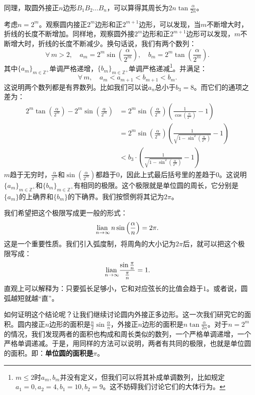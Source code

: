 \documentclass[12pt,UTF8]{ctexbook}
\begin{document}
同理，取圆外接正$n$边形$B_1B_2\ldots B_n$，可以算得其周长为$2n\tan{\frac{\alpha}{2n}}$。

考虑$n=2^m$。观察圆内接正$2^m$边形和正$2^{m+1}$边形，可以发现，当$m$不断增大时，折线的长度不断增加。同样地，观察圆外接$2^m$边形和正$2^{m+1}$边形可以发现，$m$不断增大时，折线的长度不断减少。换句话说，我们有两个数列：
$$ \forall \, m > 2, \quad a_m = 2^m\sin{\left(\frac{\alpha}{2^m}\right)}, \quad b_m = 2^{m}\tan{\left(\frac{\alpha}{2^m}\right)}. $$
其中$\{a_m\}_{m\in\mathbb{Z}^+}$单调严格递增，$\{b_m\}_{m\in\mathbb{Z}^+}$单调严格递减\footnote{$m\leqslant 2$时$a_m,b_m$并没有定义，但我们可以将其补成单调数列，比如规定$a_1=0,a_2=4,b_1=10,b_2=9$。这不妨碍我们讨论它们的大体行为。}。并满足：
$$ \forall \, m, \quad a_m < a_{m+1} < b_{m+1} < b_m.$$
这说明两个数列都是有界数列。比如我们可以说$a_n$总小于$b_3 = 8$。而它们的通项之差为：
\begin{align*}
    2^{m}\tan{\left(\frac{\alpha}{2^m}\right)} - 2^m\sin{\left(\frac{\alpha}{2^m}\right)} &= 2^m\sin{\left(\frac{\alpha}{2^m}\right)}\left(\frac{1}{\cos{\left(\frac{\alpha}{2^m}\right)}} - 1\right) \\
    &= 2^m\sin{\left(\frac{\alpha}{2^m}\right)}\left(\frac{1}{\sqrt{1 - \sin^2{\left(\frac{\alpha}{2^m}\right)}}} - 1\right) \\
    &< b_3 \cdot \left(\frac{1}{\sqrt{1 - \sin^2{\left(\frac{\alpha}{2^m}\right)}}} - 1\right)
\end{align*}
$m$趋于无穷时，$\frac{\alpha}{2^m}$和$\sin{\left(\frac{\alpha}{2^m}\right)}$都趋于$0$，因此上式最后括号里的差趋于$0$。这说明$\{a_m\}_{m\in\mathbb{Z}^+}$和$\{b_m\}_{m\in\mathbb{Z}^+}$有相同的极限。这个极限就是单位圆的周长，它分别是$\{a_m\}$的上确界和$\{b_m\}$的下确界。我们按惯例将其记为$2\pi$。

我们希望把这个极限写成更一般的形式：
$$ \underset{n\to\infty}{\operatorname{lian}\,}\, n\sin{\left(\frac{\alpha}{n}\right)} = 2\pi.$$
这是一个重要性质。我们引入弧度制，将周角的大小记为$2\pi$后，就可以把这个极限写成：
$$ \underset{n\to\infty}{\operatorname{lian}\,} \frac{\sin{\frac{\pi}{n}}}{\frac{\pi}{n}} = 1. $$
直观上可以解释为：只要弧长足够小，它和对应弦长的比值会趋于$1$。或者说，圆弧越短就越“直”。

如何证明这个结论呢？让我们继续讨论圆内外接正多边形。这一次我们研究它的面积。圆内接正$n$边形的面积是$\frac{n}{2}\sin{\frac{\alpha}{n}}$，外接正$n$边形的面积是$n\tan{\frac{\alpha}{2n}}$。对于$n=2^m$的情况，我们发现两者的面积也构成和周长类似的数列，一个严格单调递增，一个严格单调递减。于是，用同样的方法可以说明，两者有共同的极限，也就是单位圆的面积。即：\textbf{单位圆的面积是}$\pi$。
\end{document}
